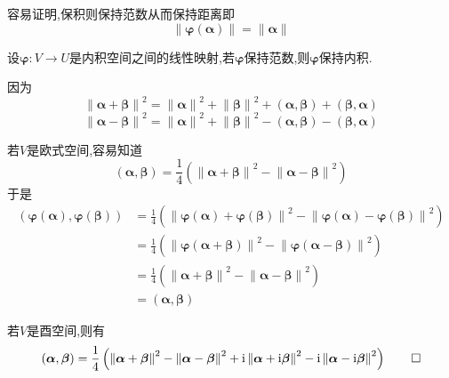 \begin{red}
    \begin{remark}
        容易证明,保积则保持范数从而保持距离即\[
        \left\lVert \bm{\varphi}\left(\bm{\alpha}\right)\right\rVert=\left\lVert \bm{\alpha}\right\rVert
        \]
    \end{remark}
\end{red}
\begin{formal}
    \begin{proposition}[保持范数与保持内积]\label{prop:保持范数与保持内积}
        设$\bm{\varphi}:V\longrightarrow U$是内积空间之间的线性映射,若$\bm{\varphi}$保持范数,则$\bm{\varphi}$保持内积.
    \end{proposition}
    \begin{Proof}
        因为\[
        \left\lVert\bm{\alpha}+\bm{\beta}\right\rVert^2=\left\lVert\bm{\alpha}\right\rVert^2+\left\lVert\bm{\beta}\right\rVert^2+\left(\bm{\alpha},\bm{\beta}\right)+\left(\bm{\beta},\bm{\alpha}\right)
        \]\[
        \left\lVert\bm{\alpha}-\bm{\beta}\right\rVert^2=\left\lVert\bm{\alpha}\right\rVert^2+\left\lVert\bm{\beta}\right\rVert^2-\left(\bm{\alpha},\bm{\beta}\right)-\left(\bm{\beta},\bm{\alpha}\right)
        \]

        若$V$是欧式空间,容易知道\[
        \left(
            \bm{\alpha},\bm{\beta}
        \right)=\frac{1}{4}\left(
            \left\lVert\bm{\alpha}+\bm{\beta}\right\rVert^2-\left\lVert\bm{\alpha}-\bm{\beta}\right\rVert^2
        \right)
        \]于是\begin{align*}
                    \left(
            \bm{\varphi}\left(\bm{\alpha}\right),\bm{\varphi}\left(\bm{\beta}\right)
        \right)&=\frac{1}{4}\left(
            \left\lVert\bm{\varphi}\left(\bm{\alpha}\right)+\bm{\varphi}\left(\bm{\beta}\right)\right\rVert^2-\left\lVert\bm{\varphi}\left(\bm{\alpha}\right)-\bm{\varphi}\left(\bm{\beta}\right)\right\rVert^2
        \right)\\
        &=\frac{1}{4}\left(
                \left\lVert\bm{\varphi}\left(\bm{\alpha}+\bm{\beta}\right)\right\rVert^2-\left\lVert\bm{\varphi}\left(\bm{\alpha}-\bm{\beta}\right)\right\rVert^2
            \right)\\
            &=\frac{1}{4}\left(
                \left\lVert\bm{\alpha}+\bm{\beta}\right\rVert^2-\left\lVert\bm{\alpha}-\bm{\beta}\right\rVert^2
            \right)\\
            &=\left(
                \bm{\alpha},\bm{\beta}
            \right)
        \end{align*}

        若$V$是酉空间,则有\begin{align*}
            \left(
                \bm{\alpha},\bm{\beta}
            \right)=\frac{1}{4}\left(
                \left\lVert\bm{\alpha}+\bm{\beta}\right\rVert^2-\left\lVert\bm{\alpha}-\bm{\beta}\right\rVert^2+\mathrm{i}\left\lVert\bm{\alpha}+\mathrm{i}\bm{\beta}\right\rVert^2-\mathrm{i}\left\lVert\bm{\alpha}-\mathrm{i}\bm{\beta}\right\rVert^2
            \right)\qedhere
        \end{align*}
    \end{Proof}
\end{formal}
